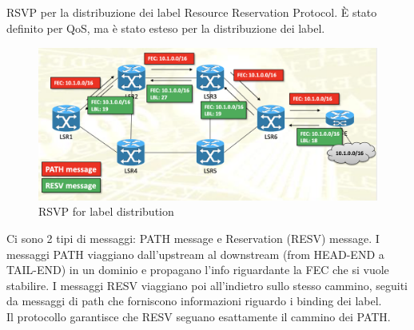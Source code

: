 \documentclass{article}
\begin{document}
\subsection{}{RSVP per la distribuzione dei label} Resource Reservation Protocol. È stato definito per QoS, ma è stato esteso per la distribuzione dei label. 
\begin{figure}[H]
    \centering
    \includegraphics[scale=0.4]{figures/RSVP label distribution.png}
    \caption{RSVP for label distribution}
\end{figure}
Ci sono 2 tipi di messaggi: PATH message e Reservation (RESV) message. I messaggi PATH viaggiano dall'upstream al downstream (from HEAD-END a TAIL-END) in un dominio e propagano l'info riguardante la FEC che si vuole stabilire. I messaggi RESV viaggiano poi all'indietro sullo stesso cammino, seguiti da messaggi di path che forniscono informazioni riguardo i binding dei label. \\ Il protocollo garantisce che RESV seguano esattamente il cammino dei PATH.
\end{document}
